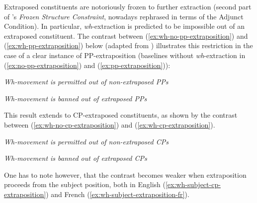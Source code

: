 \documentclass[11pt]{article}
\begin{document}
Extraposed constituents are notoriously frozen to further extraction (second part of \cite{Ross1967}'s \textit{Frozen Structure Constraint}, nowadays rephrased in terms of the Adjunct Condition). In particular, \textit{wh}-extraction is predicted to be impossible out of an extraposed constituent. The contrast between (\ref{ex:wh-no-pp-extraposition}) and (\ref{ex:wh-pp-extraposition}) below (adapted from \cite{Keller1995}) illustrates this restriction in the case of a clear instance of PP-extraposition (baselines without \textit{wh}-extraction in (\ref{ex:no-pp-extraposition}) and (\ref{ex:pp-extraposition})):
\begin{exe}
	\ex \textit{Wh-movement is permitted out of non-extraposed PPs}
	\begin{xlist}
		 \label{ex:no-pp-extraposition}
		 \label{ex:wh-no-pp-extraposition}
	\end{xlist}
	\ex \textit{Wh-movement is banned out of extraposed PPs}
	\begin{xlist}
		\label{ex:pp-extraposition}
		\label{ex:wh-pp-extraposition}
	\end{xlist}
\end{exe}
	 This result extends to CP-extraposed constituents, as shown by the contrast between (\ref{ex:wh-no-cp-extraposition}) and (\ref{ex:wh-cp-extraposition}).
	\begin{exe}
		\ex \textit{Wh-movement is permitted out of non-extraposed CPs}
		\begin{xlist}
			 \label{ex:no-cp-extraposition}
			\label{ex:wh-no-cp-extraposition}
		\end{xlist}
		\ex \textit{Wh-movement is banned out of extraposed CPs}
		\begin{xlist}
			 \label{ex:cp-extraposition}
			\label{ex:wh-cp-extraposition}
		\end{xlist}
	\end{exe}
	One has to note however, that the contrast becomes weaker when extraposition proceeds from the subject position, both in English (\ref{ex:wh-subject-cp-extraposition}) and French (\ref{ex:wh-subject-extraposition-fr}).
\end{document}
